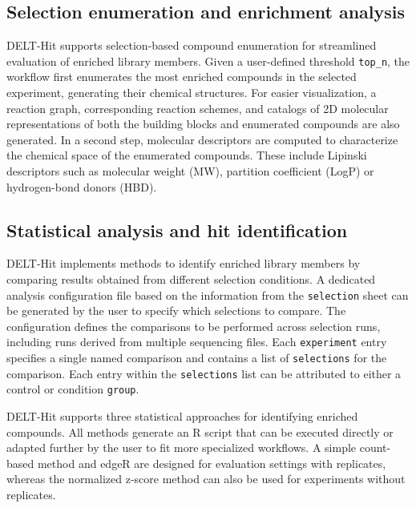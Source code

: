 \subsection{Selection enumeration and enrichment analysis}

DELT-Hit supports selection-based compound enumeration for streamlined evaluation of enriched library members. Given a user-defined threshold \texttt{top\_n}, the workflow first enumerates the most enriched compounds in the selected experiment, generating their chemical structures. For easier visualization, a reaction graph, corresponding reaction schemes, and catalogs of 2D molecular representations of both the building blocks and enumerated compounds are also generated. In a second step, molecular descriptors are computed to characterize the chemical space of the enumerated compounds. These include Lipinski descriptors such as molecular weight (MW), partition coefficient (LogP) or hydrogen-bond donors (HBD).

\subsection{Statistical analysis and hit identification}

DELT-Hit implements methods to identify enriched library members by comparing results obtained from different selection conditions. A dedicated analysis configuration file based on the information from the \texttt{selection} sheet can be generated by the user to specify which selections to compare. The configuration defines the comparisons to be performed across selection runs, including runs derived from multiple sequencing files. Each \texttt{experiment} entry specifies a single named comparison and contains a list of \texttt{selections} for the comparison. Each entry within the \texttt{selections} list can be attributed to either a control or condition \texttt{group}. 

DELT-Hit supports three statistical approaches for identifying enriched compounds. All methods generate an R script that can be executed directly or adapted further by the user to fit more specialized workflows. A simple count-based method and edgeR are designed for evaluation settings with replicates, whereas the normalized z-score method can also be used for experiments without replicates.


